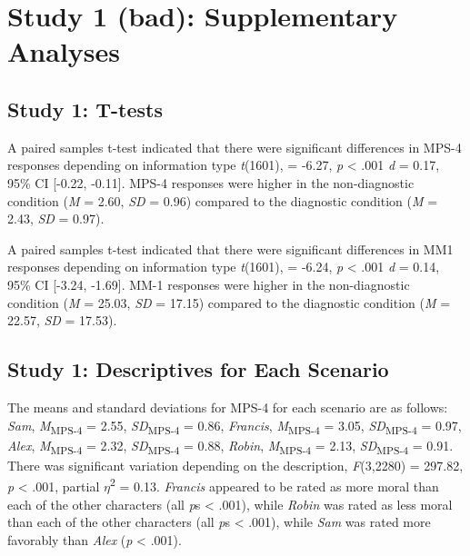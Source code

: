 \documentclass[
  man,floatsintext]{apa6}
\begin{document}
\newpage

\pagebreak

\section{Study 1 (bad): Supplementary Analyses}\label{study-1-bad-supplementary-analyses}

\subsection{Study 1: T-tests}\label{study-1-t-tests}

A paired samples t-test indicated that there were significant differences in MPS-4 responses depending on information type
\emph{t}(1601),
= -6.27,
\emph{p} \textless{} .001
\emph{d} = 0.17,
95\% CI {[}-0.22, -0.11{]}.
MPS-4 responses were higher in the non-diagnostic condition
(\emph{M} = 2.60,
\emph{SD} = 0.96)
compared to the diagnostic condition
(\emph{M} = 2.43,
\emph{SD} = 0.97).

A paired samples t-test indicated that there were significant differences in MM1 responses depending on information type
\emph{t}(1601),
= -6.24,
\emph{p} \textless{} .001
\emph{d} = 0.14,
95\% CI {[}-3.24, -1.69{]}.
MM-1 responses were higher in the non-diagnostic condition
(\emph{M} = 25.03,
\emph{SD} = 17.15)
compared to the diagnostic condition
(\emph{M} = 22.57,
\emph{SD} = 17.53).

\subsection{Study 1: Descriptives for Each Scenario}\label{study-1-descriptives-for-each-scenario}

The means and standard deviations for MPS-4 for each scenario are as follows:
\emph{Sam},
\emph{M}\textsubscript{MPS-4} = 2.55, \emph{SD}\textsubscript{MPS-4} = 0.86,
\emph{Francis},
\emph{M}\textsubscript{MPS-4} = 3.05, \emph{SD}\textsubscript{MPS-4} = 0.97,
\emph{Alex},
\emph{M}\textsubscript{MPS-4} = 2.32, \emph{SD}\textsubscript{MPS-4} = 0.88,
\emph{Robin},
\emph{M}\textsubscript{MPS-4} = 2.13, \emph{SD}\textsubscript{MPS-4} = 0.91. There was significant variation depending on the description, \emph{F}(3,2280) = 297.82, \emph{p} \textless{} .001, partial \(\eta\)\textsuperscript{2} = 0.13. \emph{Francis} appeared to be rated as more moral than each of the other characters (all \emph{p}s \textless{} .001), while \emph{Robin} was rated as less moral than each of the other characters (all \emph{p}s \textless{} .001), while \emph{Sam} was rated more favorably than \emph{Alex} (\emph{p} \textless{} .001).
\end{document}
